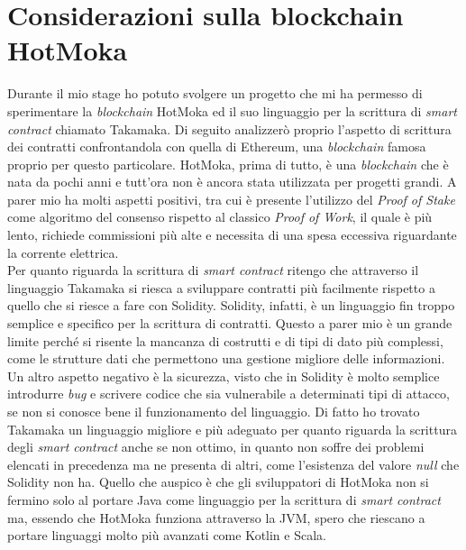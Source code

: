 
\section{Considerazioni sulla blockchain HotMoka}
Durante il mio stage ho potuto svolgere un progetto che mi ha permesso di sperimentare la \textit{blockchain} HotMoka ed il suo linguaggio per la scrittura di \textit{smart contract} chiamato Takamaka. Di seguito analizzerò proprio l'aspetto di scrittura dei contratti confrontandola con quella di Ethereum, una \textit{blockchain} famosa proprio per questo particolare. 
HotMoka, prima di tutto, è una \textit{blockchain} che è nata da pochi anni e tutt'ora non è ancora stata utilizzata per progetti grandi. A parer mio ha molti aspetti positivi, tra cui è presente l'utilizzo del \textit{Proof of Stake} come algoritmo del consenso rispetto al classico \textit{Proof of Work}, il quale è più lento, richiede commissioni più alte e necessita di una spesa eccessiva riguardante la corrente elettrica. \\

Per quanto riguarda la scrittura di \textit{smart contract} ritengo che attraverso il linguaggio Takamaka si riesca a sviluppare contratti più facilmente rispetto a quello che si riesce a fare con Solidity. Solidity, infatti, è un linguaggio fin troppo semplice e specifico per la scrittura di contratti. Questo a parer mio è un grande limite perché si risente la mancanza di costrutti e di tipi di dato più complessi, come le strutture dati che permettono una gestione migliore delle informazioni. Un altro aspetto negativo è la sicurezza, visto che in Solidity è molto semplice introdurre \textit{bug} e scrivere codice che sia vulnerabile a determinati tipi di attacco, se non si conosce bene il funzionamento del linguaggio.
Di fatto ho trovato Takamaka un linguaggio migliore e più adeguato per quanto riguarda la scrittura degli \textit{smart contract} anche se non ottimo, in quanto non soffre dei problemi elencati in precedenza ma ne presenta di altri, come l'esistenza del valore \textit{null} che Solidity non ha. Quello che auspico è che gli sviluppatori di HotMoka non si fermino solo al portare Java come linguaggio per la scrittura di \textit{smart contract} ma, essendo che HotMoka funziona attraverso la JVM, spero che riescano a portare linguaggi molto più avanzati come Kotlin e Scala. \\

